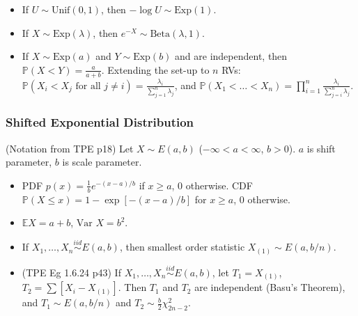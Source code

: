 \documentclass[twoside]{article}
\newcommand{\dis}{\displaystyle}
\newcommand\bbE{\mathbb{E}}
\newcommand\bbP{\mathbb{P}}
\newcommand\lmb{\lambda}
\newcommand\var{\text{Var }}
\begin{document}
\begin{itemize}
\item If $U \sim \text{Unif}(0,1)$, then $- \log U \sim \text{Exp}(1)$.

\item If $X \sim \text{Exp}(\lmb)$, then $e^{-X} \sim \text{Beta}(\lmb, 1)$.

\item If $X \sim \text{Exp}(a)$ and $Y \sim \text{Exp}(b)$ and are independent, then $\bbP(X < Y) = \displaystyle\frac{a}{a+b}$. Extending the set-up to $n$ RVs: $\bbP (X_i < X_j \text{ for all } j \neq i) = \displaystyle\frac{\lmb_i}{\sum_{j=1}^n \lmb_j}$, and $\bbP (X_1 < \dots < X_n) = \prod_{i=1}^n \frac{\lmb_i}{\sum_{j=i}^n \lmb_j}$.

\end{itemize}

\subsubsection{Shifted Exponential Distribution}
(Notation from TPE p18) Let $X \sim E(a,b)$ ($-\infty < a < \infty$, $b > 0$). $a$ is shift parameter, $b$ is scale parameter.
\begin{itemize}
\item PDF $p(x) = \displaystyle\frac{1}{b}e^{-(x-a)/b}$ if $x \geq a$, 0 otherwise. CDF $\bbP (X \leq x) = 1 - \exp [-(x-a)/b]$ for $x \geq a$, 0 otherwise.

\item $\bbE X = a+b$, $\var X = b^2$.

\item If $X_1, \dots, X_n \stackrel{iid}{\sim} E(a,b)$, then smallest order statistic $X_{(1)} \sim E (a, b/n)$.

\item (TPE Eg 1.6.24 p43) If $X_1, \dots, X_n \stackrel{iid}{\sim} E(a,b)$, let $T_1 = X_{(1)}$, $T_2 = \sum [X_i - X_{(1)}]$. Then $T_1$ and $T_2$ are independent (Basu's Theorem), and $T_1 \sim E(a, b/n)$ and $T_2 \sim \dis\frac{b}{2} \chi_{2n-2}^2$.
\end{itemize}

\end{document}
